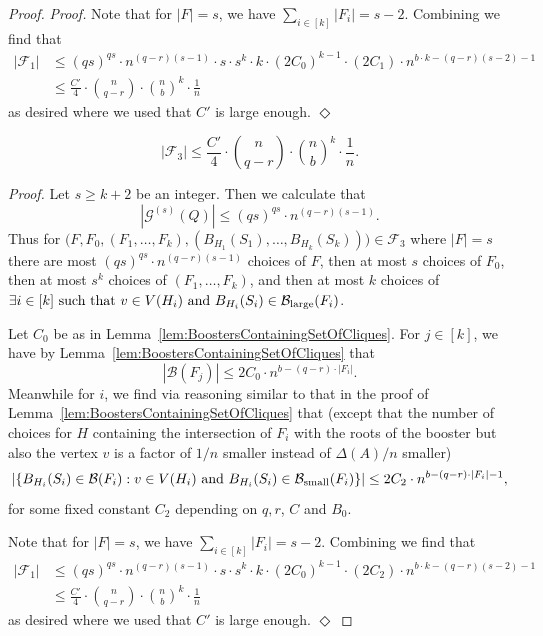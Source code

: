\documentclass[11pt]{article}
\newcommand{\mc}[1]{\mathcal{#1}}
\newcounter{i}
\theoremstyle{plain}
\newenvironment{proofclaim}[1][]%
{\noindent \emph{Proof.} {}{#1}{}}{\hfill
	$\Diamond$\vspace{1em}}
\renewcommand{\theclaim}{\thetheorem.\arabic{claim}}
\newenvironment{nonlateproof}[1]
 {%
  \renewcommand{\theclaim}{\ref{#1}.\arabic{claim}}%
  \begin{proof}%
 }
 {\end{proof}}
\theoremstyle{plain} %
\theoremstyle{definition}
\begin{document}
\begin{nonlateproof}{lem:UncommonDegree}
\begin{proofclaim}
Note that for $|F|=s$, we have $\sum_{i\in [k]} |F_i|=s-2$. Combining we find that
\begin{align*}
|\mc{F}_1| &\le (qs)^{qs} \cdot n^{(q-r)(s-1)}\cdot s \cdot s^k \cdot k \cdot (2C_0)^{k-1}\cdot (2C_1)\cdot n^{b\cdot k-(q-r)(s-2)-1} \\
&\le \frac{C'}{4} \cdot \binom{n}{q-r}\cdot \binom{n}{b}^k \cdot \frac{1}{n}
\end{align*}
as desired where we used that $C'$ is large enough.    
\end{proofclaim}

\begin{claim}
$$|\mc{F}_3| \le \frac{C'}{4} \cdot \binom{n}{q-r}\cdot \binom{n}{b}^k \cdot \frac{1}{n}.$$    
\end{claim}
\begin{proofclaim}
Let $s\ge k+2$ be an integer. Then we calculate that
$$|\mc{G}^{(s)}(Q)| \le (qs)^{qs} \cdot n^{(q-r)(s-1)}.$$
Thus for $\bigg(F, F_0, (F_1,\dots, F_k), (B_{H_1}(S_1),\ldots, B_{H_k}(S_k))\bigg)\in \mc{F}_3$ where $|F|=s$ there are most $(qs)^{qs} \cdot n^{(q-r)(s-1)}$ choices of $F$, then at most $s$ choices of $F_0$, then at most $s^k$ choices of $(F_1,\dots, F_k)$, and then at most $k$ choices of $\exists i\in [k] \text{ such that } v\in V(H_i) \text { and } B_{H_i}(S_i)\in \mc{B}_{\rm large}(F_i)$. 

Let $C_0$ be as in Lemma~\ref{lem:BoostersContainingSetOfCliques}. For $j\in [k]$, we have by Lemma~\ref{lem:BoostersContainingSetOfCliques} that
$$|\mc{B}(F_j)| \le 2C_0\cdot n^{b-(q-r)\cdot |F_i|}.$$
Meanwhile for $i$, we find via reasoning similar to that in the proof of Lemma~\ref{lem:BoostersContainingSetOfCliques} that (except that the number of choices for $H$ containing the intersection of $F_i$ with the roots of the booster but also the vertex $v$ is a factor of $1/n$ smaller instead of $\Delta(A)/n$ smaller)
$$|\{B_{H_i}(S_i)\in \mc{B}(F_i): v\in V(H_i) \text { and }B_{H_i}(S_i)\in \mc{B}_{\rm small}(F_i)\}| \le 2C_2\cdot n^{b-(q-r)\cdot |F_i|-1},$$
for some fixed constant $C_2$ depending on $q,r$, $C$ and $B_0$. 

Note that for $|F|=s$, we have $\sum_{i\in [k]} |F_i|=s-2$. Combining we find that
\begin{align*}
|\mc{F}_1| &\le (qs)^{qs} \cdot n^{(q-r)(s-1)}\cdot s \cdot s^k\cdot k \cdot (2C_0)^{k-1}\cdot (2C_2)\cdot n^{b\cdot k-(q-r)(s-2)-1} \\
&\le \frac{C'}{4} \cdot \binom{n}{q-r}\cdot \binom{n}{b}^k \cdot \frac{1}{n}
\end{align*}
as desired where we used that $C'$ is large enough.        
\end{proofclaim}


\end{nonlateproof}
\end{document}
